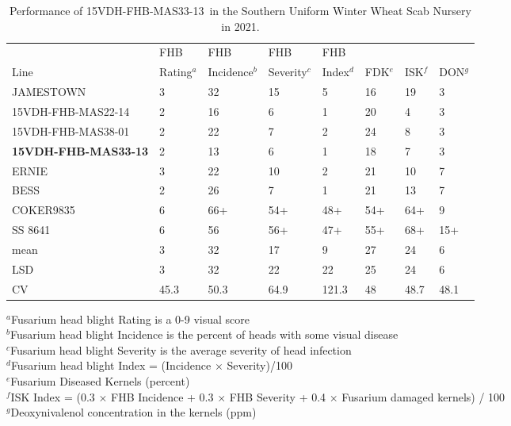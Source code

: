 \documentclass[12pt, letterpaper]{article}
\newcommand{\lin}{15VDH-FHB-MAS33-13~}
\begin{document}
\begin{landscape}
\begin{table}[ht]
\caption{Performance of \lin in the Southern Uniform Winter Wheat Scab Nursery in 2021.}
\label{ussn}
\begin{tabular}{llllllll}
  \hline
 & FHB & FHB & FHB & FHB &  &  &  \\ 
Line & Rating$^a$ & Incidence$^b$ & Severity$^c$ & Index$^d$ & FDK$^e$ & ISK$^f$ & DON$^g$ \\ 
  \hline
  JAMESTOWN & 3 & 32 & 15 & 5 & 16 & 19 & 3 \\ 
  15VDH-FHB-MAS22-14 & 2 & 16 & 6 & 1 & 20 & 4 & 3 \\ 
  15VDH-FHB-MAS38-01 & 2 & 22 & 7 & 2 & 24 & 8 & 3 \\ 
  \textbf{15VDH-FHB-MAS33-13} & 2 & 13 & 6 & 1 & 18 & 7 & 3 \\ 
  ERNIE & 3 & 22 & 10 & 2 & 21 & 10 & 7 \\ 
  BESS & 2 & 26 & 7 & 1 & 21 & 13 & 7 \\ 
  COKER9835 & 6 & 66+ & 54+ & 48+ & 54+ & 64+ & 9 \\ 
  SS 8641 & 6 & 56 & 56+ & 47+ & 55+ & 68+ & 15+ \\ 
   \hline
  mean & 3 & 32 & 17 & 9 & 27 & 24 & 6 \\ 
  LSD & 3 & 32 & 22 & 22 & 25 & 24 & 6 \\ 
  CV & 45.3 & 50.3 & 64.9 & 121.3 & 48 & 48.7 & 48.1 \\ 
   \hline
\end{tabular}

\raggedright{
\footnotesize
$^a$Fusarium head blight Rating is a 0-9 visual score  \\
$^b$Fusarium head blight Incidence is the percent of heads with some visual disease \\
$^c$Fusarium head blight Severity is the average severity of head infection  \\
$^d$Fusarium head blight Index = (Incidence $\times$ Severity)/100 \\
$^e$Fusarium Diseased Kernels (percent) \\
$^f$ISK Index = (0.3 $\times$ FHB Incidence + 0.3 $\times$ FHB Severity + 0.4 $\times$ Fusarium damaged kernels) / 100\\
$^g$Deoxynivalenol concentration in the kernels (ppm)\\
}
\end{table}


\newpage


\end{landscape}
\end{document}
